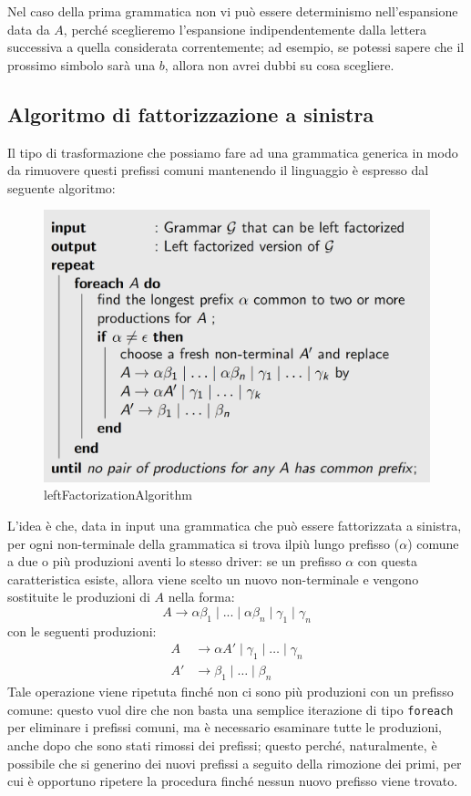 \documentclass[class=book, crop=false, oneside, 12pt]{standalone}
\begin{document}
Nel caso della prima grammatica non vi può essere determinismo nell'espansione data da \(A\), perché sceglieremo l'espansione indipendentemente dalla lettera successiva a quella considerata correntemente; ad esempio, se potessi sapere che il prossimo simbolo sarà una \(b\), allora non avrei dubbi su cosa scegliere.

\subsection{Algoritmo di fattorizzazione a sinistra}
Il tipo di trasformazione che possiamo fare ad una grammatica generica in modo da rimuovere questi prefissi comuni mantenendo il linguaggio è espresso dal seguente algoritmo: 

\begin{figure}[H]
    \centering
    \includegraphics[width=.7\textwidth,keepaspectratio]{leftFactorizationAlgorithm.png}
    \caption{leftFactorizationAlgorithm}
    \label{leftFactorizationAlgorithm}
\end{figure}

L'idea è che, data in input una grammatica che può essere fattorizzata a sinistra, per ogni non-terminale della grammatica si trova ilpiù lungo prefisso (\(\alpha\)) comune a due o più produzioni aventi lo stesso driver: se un prefisso \(\alpha\) con questa caratteristica esiste, allora viene scelto un nuovo non-terminale e vengono sostituite le produzioni di \(A\) nella forma: 
\begin{equation*}
    A \rightarrow \alpha \beta_1 \mid ... \mid \alpha \beta_n \mid \gamma_1 \mid \gamma_n
\end{equation*}
con le seguenti produzioni: 
\begin{align*}
    A &\rightarrow \alpha A' \mid \gamma_1 \mid \ldots \mid \gamma_n \\
    A' &\rightarrow \beta_1 \mid \ldots \mid \beta_n
\end{align*}
Tale operazione viene ripetuta finché non ci sono più produzioni con un prefisso comune: questo vuol dire che non basta una semplice iterazione di tipo \texttt{foreach} per eliminare i prefissi comuni, ma è necessario esaminare tutte le produzioni, anche dopo che sono stati rimossi dei prefissi; questo perché, naturalmente, è possibile che si generino dei nuovi prefissi a seguito della rimozione dei primi, per cui è opportuno ripetere la procedura finché nessun nuovo prefisso viene trovato.
\end{document}

